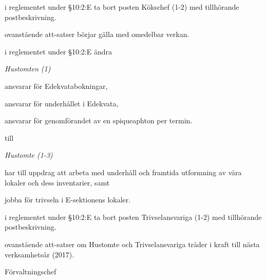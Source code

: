 \documentclass[../_main/handlingar.tex]{subfiles}
\begin{document}
\begin{attsatser}
    \att i reglementet under \S10:2:E ta bort posten Kökschef (1-2) med tillhörande postbeskrivning.

    \att ovanstående att-satser börjar gälla med omedelbar verkan.

    \newpage

    \att i reglementet under \S10:2:E ändra\par
    {\it
    Hustomten (1)
    \begin{tightdashlist}
        \item ansvarar för Edekvatabokningar,
        \item ansvarar för underhållet i Edekvata,
        \item ansvarar för genomförandet av en spiqueaphton per termin.
    \end{tightdashlist}
    }
    till\par
    {\it
    Hustomte (1-3)
    \begin{tightdashlist}
        \item har till uppdrag att arbeta med underhåll och framtida utformning  av våra lokaler och dess inventarier, samt
        \item jobba för trivseln i E-sektionens lokaler.
    \end{tightdashlist}
    }
    \att i reglementet under \S10:2:E ta bort posten Trivselansvariga (1-2) med tillhörande postbeskrivning.

    \att ovanstående att-satser om Hustomte och Trivselansvariga träder i kraft till nästa verksamhetsår (2017).
\end{attsatser}

\begin{signatures}{1}
    \ist
    \signature{Anders Nilsson}{Förvaltningschef}
\end{signatures}
\end{document}
